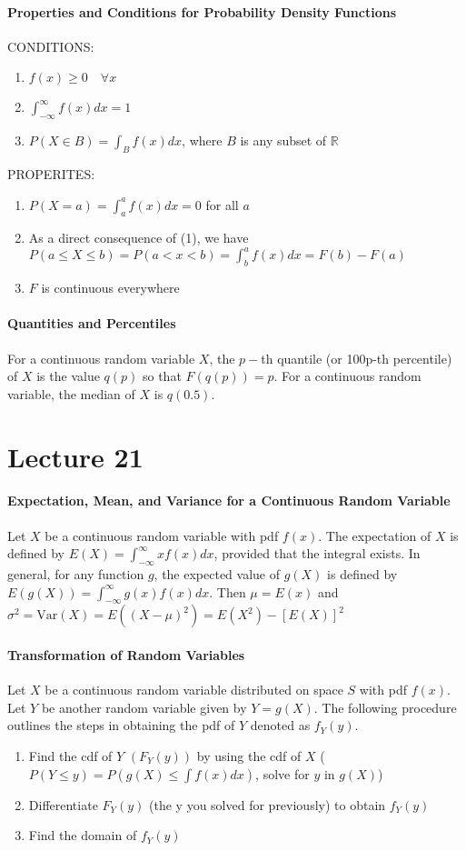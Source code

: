 \documentclass[10pt,letter]{article}
\begin{document}
\paragraph{Properties and Conditions for Probability Density Functions}
CONDITIONS: \begin{enumerate}
    \item $f(x)\geq0\quad\forall x$
    \item $\int_{-\infty}^\infty f(x)dx=1$
    \item $P(X\in B)=\int_B f(x)dx$, where $B$ is any subset of $\mathbb{R}$
\end{enumerate}
PROPERITES: \begin{enumerate}
    \item $P(X=a)=\int_a^af(x)dx=0$ for all $a$ 
    \item As a direct consequence of (1), we have $P(a\leq X\leq b)=P(a<x<b)=\int_b^af(x)dx=F(b)-F(a)$
    \item $F$ is continuous everywhere 
\end{enumerate}

\paragraph{Quantities and Percentiles}
For a continuous random variable $X$, the $p-$th quantile (or 100p-th percentile) of $X$ is the value $q(p)$ so that $F(q(p))=p$. For a continuous random variable, the median of $X$ is $q(0.5)$. 

\section*{Lecture 21}
\paragraph{Expectation, Mean, and Variance for a Continuous Random Variable}
Let $X$ be a continuous random variable with pdf $f(x)$. The expectation of $X$ is defined by $E(X)=\int_{-\infty}^\infty xf(x)dx$, provided that the integral exists. In general, for any function $g$, the expected value of $g(X)$ is defined by $E(g(X))=\int_{-\infty}^\infty g(x)f(x)dx$. Then $\mu=E(x)$ and $\sigma^2=\text{Var}(X)=E((X-\mu)^2)=E(X^2)-[E(X)]^2$
\paragraph{Transformation of Random Variables}
Let $X$ be a continuous random variable distributed on space $S$ with pdf $f(x)$. Let $Y$ be another random variable given by $Y=g(X)$. The following procedure outlines the steps in obtaining the pdf of $Y$ denoted as $f_Y(y)$. \begin{enumerate}
    \item Find the cdf of $Y$ $(F_Y(y))$ by using the cdf of $X$ ($P(Y\leq y)=P(g(X)\leq \int f(x)dx)$, solve for $y$ in $g(X)$)
    \item Differentiate $F_Y(y)$ (the y you solved for previously) to obtain $f_Y(y)$ 
    \item Find the domain of $f_Y(y)$ 
\end{enumerate}
\end{document}
